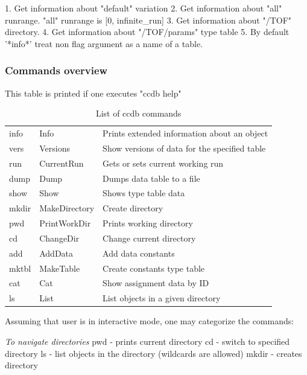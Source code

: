 \documentclass{article}
\begin{document}
1. Get information about "default" variation
2. Get information about "all" runrange. "all" runrange is [0, infinite\_run]
3. Get information about "/TOF" directory.
4. Get information about "/TOF/params" type table
5. By default '*info*' treat non flag argument as a name of a table.

\subsubsection{Commands overview}

This table is printed if one executes "ccdb help"
\begin{table}[position specifier]
\centering
\begin{tabular}{| l | l | l |}
  \hline
  info   & Info          & Prints extended information about an object \\
  vers   & Versions      & Show versions of data for the specified table \\
  run    & CurrentRun    & Gets or sets current working run \\
  dump   & Dump          & Dumps data table to a file \\
  show   & Show          & Shows type table data \\
  mkdir  & MakeDirectory & Create directory \\
  pwd    & PrintWorkDir  & Prints working directory \\
  cd     & ChangeDir     & Change current directory \\
  add    & AddData       & Add data constants \\
  mktbl  & MakeTable     & Create constants type table \\
  cat    & Cat           & Show assignment data by ID \\
  ls     & List          & List objects in a given directory \\
  \hline
\end{tabular}
\caption{List of ccdb commands}
\label{tab:commands}
\end{table}

Assuming that user is in interactive mode, one may categorize the commands:


\emph{To navigate directories}
pwd - prints current directory
cd  - switch to specified directory
ls  - list objects in the directory (wildcards are allowed)
mkdir - creates directory
\end{document}
